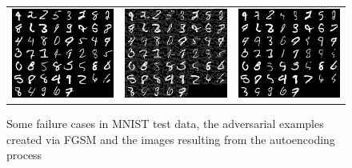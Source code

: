 \documentclass[twoside]{article}
\theoremstyle{definition}
\begin{document}
\begin{figure}[H]
\centering
\begin{tabular}{ccc}
\includegraphics[width=2in]{cl_original.png} &
\includegraphics[width=2in]{cl_adversarial.png} &
\includegraphics[width=2in]{cl_reconstr.png}
\end{tabular}
\caption{Some failure cases in MNIST test data, the adversarial examples created via FGSM and the images resulting from the autoencoding process}
\end{figure}




\end{document}
